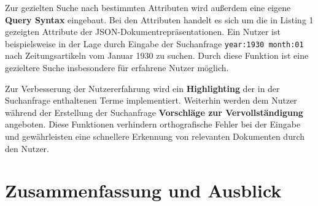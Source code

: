 \documentclass[11pt,a4paper, halfparskip]{scrartcl}
\begin{document}
Zur gezielten Suche nach bestimmten Attributen wird außerdem eine eigene \textbf{Query Syntax} eingebaut. 
Bei den Attributen handelt es sich um die in Listing 1 gezeigten Attribute der JSON-Dokumentrepräsentationen.
Ein Nutzer ist beispielsweise in der Lage durch Eingabe der Suchanfrage \texttt{year:1930 month:01} nach Zeitungsartikeln vom Januar 1930 zu suchen.
Durch diese Funktion ist eine gezieltere Suche insbesondere für erfahrene Nutzer möglich.

Zur Verbesserung der Nutzererfahrung wird ein \textbf{Highlighting} der in der Suchanfrage enthaltenen Terme implementiert.
Weiterhin werden dem Nutzer während der Erstellung der Suchanfrage \textbf{Vorschläge zur Vervollständigung} angeboten.
Diese Funktionen verhindern orthografische Fehler bei der Eingabe und gewährleisten eine schnellere Erkennung von relevanten Dokumenten durch den Nutzer.

\section{Zusammenfassung und Ausblick}

\end{document}
